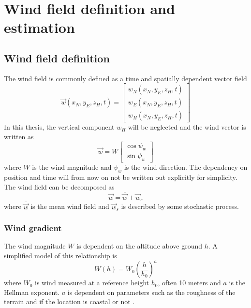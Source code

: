 \chapter{Wind field definition and estimation}\label{cha:wind}
\section{Wind field definition}
The wind field is commonly defined as a time and spatially dependent vector field
\begin{equation}
    \vec{w}(x_N,y_E,z_H,t)=
    \begin{bmatrix}
        w_N(x_N,y_E,z_H,t) \\
        w_E(x_N,y_E,z_H,t) \\
        w_H(x_N,y_E,z_H,t)
    \end{bmatrix}
\end{equation}
In this thesis, the vertical component $w_H$ will be neglected and the wind vector is written as 
\begin{equation}
    \vec{w}=W\begin{bmatrix}
        \cos\psi_w\\
        \sin\psi_w
    \end{bmatrix}
\end{equation}
where $W$ is the wind magnitude and $\psi_w$ is the wind direction. The dependency on position and time will from now on not be written out explicitly for simplicity.
The wind field can be decomposed as
\begin{equation}
    \vec{w} = \bar{\vec{w}} + \vec{w}_s
\end{equation}
where $\bar{\vec{w}}$ is the mean wind field and $\vec{w}_s$ is described by some stochastic process.

\subsection{Wind gradient}
The wind magnitude $W$ is dependent on the altitude above ground $h$. A simplified model of this relationship is 
\begin{equation}
    W(h)=W_{0}\left(\frac{h}{h_0}\right)^a
\end{equation}
where $W_{0}$ is wind measured at a reference height $h_0$, often 10 meters and $a$ is the Hellman exponent. $a$ is dependent on parameters such as the 
roughness of the terrain and if the location is coastal or not \cite{wind_hellman}.
